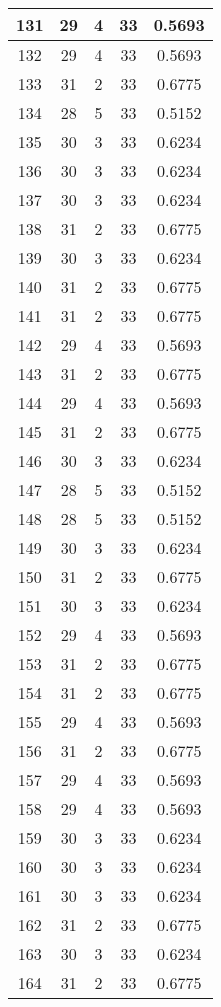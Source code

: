 \documentclass[letterpaper, 12pt]{article}
\begin{document}
\begin{longtable}{|c|c|c|c|c|}
\hline
131 & 29 & 4 & 33 & 0.5693 \\
\hline
132 & 29 & 4 & 33 & 0.5693 \\
\hline
133 & 31 & 2 & 33 & 0.6775 \\
\hline
134 & 28 & 5 & 33 & 0.5152 \\
\hline
135 & 30 & 3 & 33 & 0.6234 \\
\hline
136 & 30 & 3 & 33 & 0.6234 \\
\hline
137 & 30 & 3 & 33 & 0.6234 \\
\hline
138 & 31 & 2 & 33 & 0.6775 \\
\hline
139 & 30 & 3 & 33 & 0.6234 \\
\hline
140 & 31 & 2 & 33 & 0.6775 \\
\hline
141 & 31 & 2 & 33 & 0.6775 \\
\hline
142 & 29 & 4 & 33 & 0.5693 \\
\hline
143 & 31 & 2 & 33 & 0.6775 \\
\hline
144 & 29 & 4 & 33 & 0.5693 \\
\hline
145 & 31 & 2 & 33 & 0.6775 \\
\hline
146 & 30 & 3 & 33 & 0.6234 \\
\hline
147 & 28 & 5 & 33 & 0.5152 \\
\hline
148 & 28 & 5 & 33 & 0.5152 \\
\hline
149 & 30 & 3 & 33 & 0.6234 \\
\hline
150 & 31 & 2 & 33 & 0.6775 \\
\hline
151 & 30 & 3 & 33 & 0.6234 \\
\hline
152 & 29 & 4 & 33 & 0.5693 \\
\hline
153 & 31 & 2 & 33 & 0.6775 \\
\hline
154 & 31 & 2 & 33 & 0.6775 \\
\hline
155 & 29 & 4 & 33 & 0.5693 \\
\hline
156 & 31 & 2 & 33 & 0.6775 \\
\hline
157 & 29 & 4 & 33 & 0.5693 \\
\hline
158 & 29 & 4 & 33 & 0.5693 \\
\hline
159 & 30 & 3 & 33 & 0.6234 \\
\hline
160 & 30 & 3 & 33 & 0.6234 \\
\hline
161 & 30 & 3 & 33 & 0.6234 \\
\hline
162 & 31 & 2 & 33 & 0.6775 \\
\hline
163 & 30 & 3 & 33 & 0.6234 \\
\hline
164 & 31 & 2 & 33 & 0.6775 \\

\end{longtable}
\end{document}
